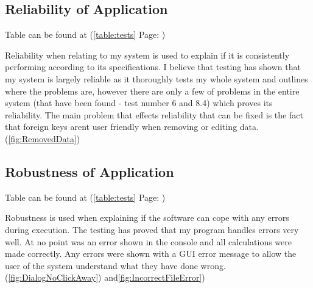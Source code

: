 \subsection{Reliability of Application}

Table can be found at (\ref{table:tests} Page: \pageref{table:tests})

Reliability when relating to my system is used to explain if it is consistently performing according to its specifications. I believe that testing has shown that my system is largely reliable as it thoroughly tests my whole system and outlines where the problems are, however there are only a few of problems in the entire system (that have been found - test number 6 and 8.4) which proves its reliability. The main problem that effects reliability that can be fixed is the fact that foreign keys arent user friendly when removing or editing data. (\ref{fig:RemovedData})

\subsection{Robustness of Application}

Table can be found at (\ref{table:tests} Page: \pageref{table:tests})

Robustness is used when explaining if the software can cope with any errors during execution. The testing has proved that my program handles errors very well. At no point was an error shown in the console and all calculations were made correctly. Any errors were shown with a GUI error message to allow the user of the system understand what they have done wrong.(\ref{fig:DialogNoClickAway}) and\ref{fig:IncorrectFileError})
